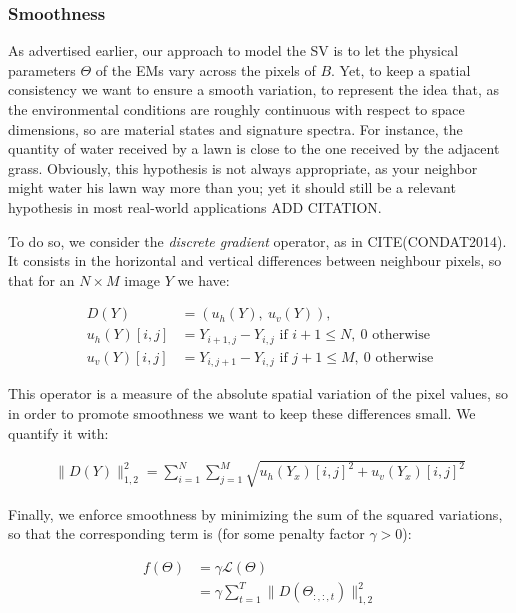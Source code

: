 \documentclass{article}
\begin{document}
\subsubsection{Smoothness}\label{sec:EM-smoothness}

As advertised earlier, our approach to model the SV is to let the physical parameters $\Theta$ of the EMs vary across the pixels of $B$. Yet, to keep a spatial consistency we want to ensure a smooth variation, to represent the idea that, as the environmental conditions are roughly continuous with respect to space dimensions, so are material states and signature spectra. For instance, the quantity of water received by a lawn is close to the one received by the adjacent grass. Obviously, this hypothesis is not always appropriate, as your neighbor might water his lawn way more than you; yet it should still be a relevant hypothesis in most real-world applications ADD CITATION.

To do so, we consider the \emph{discrete gradient} operator, as in CITE(CONDAT2014). It consists in the horizontal and vertical differences between neighbour pixels, so that for an $N \times M$ image $Y$ we have:

\begin{align*}\label{eq:discrete-grad}
  D(Y) &= (u_h (Y),\ u_v (Y)),\\
  u_h (Y) [i, j] &= Y_{i+1, j} - Y_{i, j} \text{ if }i + 1 \leq N,\ 0 \text{ otherwise}\\
  u_v (Y) [i, j] &= Y_{i, j+1} - Y_{i, j} \text{ if }j + 1 \leq M,\ 0 \text{ otherwise}
\end{align*}

This operator is a measure of the absolute spatial variation of the pixel values, so in order to promote smoothness we want to keep these differences small. We quantify it with:

\begin{align*}
  \| D(Y) \|_{1,2}^2 = \sum_{i=1}^N \sum_{j=1}^M \sqrt{ u_h (Y_{x})[i, j]^2 + u_v (Y_x)[i, j]^2 }
\end{align*}

Finally, we enforce smoothness by minimizing the sum of the squared variations, so that the corresponding term is (for some penalty factor $\gamma >0$):

\begin{align}\label{eq:f}
  f(\Theta) &= \gamma \mathcal{L}(\Theta)\\
  &= \gamma \sum_{t = 1}^{T} \| D(\Theta_{:,:,t}) \|_{1,2}^2
\end{align}
\end{document}
